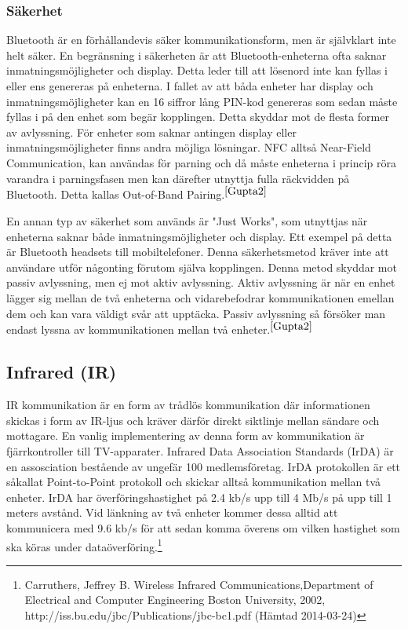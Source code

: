 \documentclass[a4paper,12pt,fleqn]{article}
\begin{document}
\subsubsection{Säkerhet}
Bluetooth är en förhållandevis säker kommunikationsform, men är självklart inte helt säker. En begränsning i säkerheten är att Bluetooth-enheterna ofta saknar inmatningsmöjligheter och display. Detta leder till att lösenord inte kan fyllas i eller ens genereras på enheterna. I fallet av att båda enheter har display och inmatningsmöjligheter kan en 16 siffror lång PIN-kod genereras som sedan måste fyllas i på den enhet som begär kopplingen. Detta skyddar mot de flesta former av avlyssning.
För enheter som saknar antingen display eller inmatningsmöjligheter finns andra möjliga lösningar. NFC alltså Near-Field Communication, kan användas för parning och då måste enheterna i princip röra varandra i parningsfasen men kan därefter utnyttja fulla räckvidden på Bluetooth. Detta kallas Out-of-Band Pairing.$^{\ref{Gupta2}}$

En annan typ av säkerhet som används är "Just Works", som utnyttjas när enheterna saknar både inmatningsmöjligheter och display. Ett exempel på detta är Bluetooth headsets till mobiltelefoner. Denna säkerhetsmetod kräver inte att användare utför någonting förutom själva kopplingen. Denna metod skyddar mot passiv avlyssning, men ej mot aktiv avlyssning. 
Aktiv avlyssning är när en enhet lägger sig mellan de två enheterna och vidarebefodrar kommunikationen emellan dem och kan vara väldigt svår att upptäcka.
Passiv avlyssning så försöker man endast lyssna av kommunikationen mellan två enheter.$^{\ref{Gupta2}}$
 
\subsection{Infrared (IR)}
IR kommunikation är en form av trådlös kommunikation där informationen skickas i form av IR-ljus och kräver därför direkt siktlinje mellan sändare och mottagare. En vanlig implementering av denna form av kommunikation är fjärrkontroller till TV-apparater.
Infrared Data Association Standards (IrDA) är en assosciation bestående av ungefär 100 medlemsföretag. IrDA protokollen är ett såkallat Point-to-Point protokoll och skickar alltså kommunikation mellan två enheter. IrDA har överföringshastighet på 2.4 kb/s upp till 4 Mb/s på upp till 1 meters avstånd. Vid länkning av två enheter kommer dessa alltid att kommunicera med 9.6 kb/s för att sedan komma överens om vilken hastighet som ska köras under dataöverföring.\footnote{\label{Carruthers}Carruthers, Jeffrey B. Wireless Infrared Communications,Department of Electrical and Computer Engineering
Boston University, 2002, http://iss.bu.edu/jbc/Publications/jbc-bc1.pdf (Hämtad 2014-03-24)}  
\end{document}
